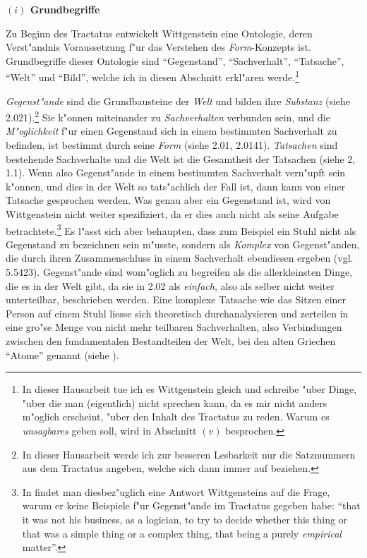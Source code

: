 \documentclass[a4paper, emulatestandardclasses, 12pt]{scrartcl}
\begin{document}
\begin{onehalfspace}
\noindent\textbf{$(i)$ Grundbegriffe}

\noindent Zu Beginn des Tractatus entwickelt Wittgenstein eine Ontologie, deren Verst"andnis Voraussetzung f"ur das Verstehen des \emph{Form}-Konzepts ist. Grundbegriffe dieser Ontologie sind "`Gegenstand"', "`Sachverhalt"', "`Tatsache"', "`Welt"' und "`Bild"', welche ich in diesen Abschnitt erkl"aren werde.\footnote{In dieser Hausarbeit tue ich es Wittgenstein gleich und schreibe "uber Dinge, "uber die man (eigentlich) nicht sprechen kann, da es mir nicht anders m"oglich erscheint, "uber den Inhalt des Tractatus zu reden. Warum es \emph{unsagbares} geben soll, wird in Abschnitt $(v)$ besprochen.}

\emph{Gegenst"ande} sind die Grundbausteine der \emph{Welt} und bilden ihre \emph{Substanz} (siehe 2.021).\footnote{In dieser Hausarbeit werde ich zur besseren Lesbarkeit nur die Satznummern aus dem Tractatus angeben, welche sich dann immer auf \cite{wittgenstein1963tractatus} beziehen.} Sie k"onnen miteinander zu \emph{Sachverhalten} verbunden sein, und die \emph{M"oglichkeit} f"ur einen Gegenstand sich in einem bestimmten Sachverhalt zu befinden, ist bestimmt durch seine \emph{Form} (siehe 2.01, 2.0141). \emph{Tatsachen} sind bestehende Sachverhalte und die Welt ist die Gesamtheit der Tatsachen (siehe 2, 1.1). Wenn also Gegenst"ande in einem bestimmten Sachverhalt vern"upft sein k"onnen, und dies in der Welt so tats"achlich der Fall ist, dann kann von einer Tatsache gesprochen werden. Was genau aber ein Gegenstand ist, wird von Wittgenstein nicht weiter spezifiziert, da er dies auch nicht als seine Aufgabe betrachtete.\footnote{In \cite[S. 70]{malcolm2001ludwig} findet man diesbez"uglich eine Antwort Wittgensteins auf die Frage, warum er keine Beispiele f"ur Gegenst"ande im Tractatus gegeben habe: "`that it was not his business, as a logician, to try to decide whether this thing or that was a simple thing or a complex thing, that being a purely \emph{empirical} matter"'.} Es l"asst sich aber behaupten, dass zum Beispiel ein Stuhl nicht als Gegenstand zu bezeichnen sein m"usste, sondern als \emph{Komplex} von Gegenst"anden, die durch ihren Zusammenschluss in einem Sachverhalt ebendiesen ergeben (vgl. 5.5423). Gegenst"ande sind wom"oglich zu begreifen als die allerkleinsten Dinge, die es in der Welt gibt, da sie in 2.02 als \emph{einfach}, also als selber nicht weiter unterteilbar, beschrieben werden. Eine komplexe Tatsache wie das Sitzen einer Person auf einem Stuhl liesse sich theoretisch durchanalysieren und zerteilen in eine gro"se Menge von nicht mehr teilbaren Sachverhalten, also Verbindungen zwischen den fundamentalen Bestandteilen der Welt, bei den alten Griechen "`Atome"' genannt (siehe \citealt{sep-atomism-ancient}). 

\end{onehalfspace}
\end{document}
